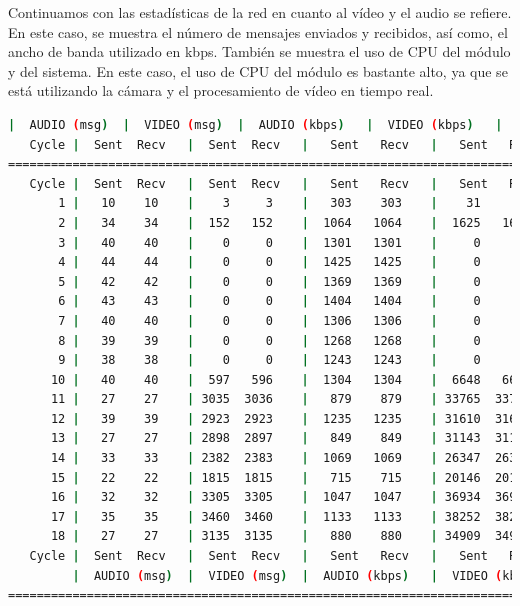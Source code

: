 Continuamos con las estadísticas de la red en cuanto al vídeo y el audio se refiere. En este caso, se muestra el número de mensajes enviados y recibidos, así como, el ancho de banda utilizado en kbps. También se muestra el uso de CPU del módulo y del sistema. En este caso, el uso de CPU del módulo es bastante alto, ya que se está utilizando la cámara y el procesamiento de vídeo en tiempo real. 
\begin{lstlisting}[language=bash,basicstyle=\ttfamily\tiny]
         |  AUDIO (msg)  |  VIDEO (msg)  |  AUDIO (kbps)   |  VIDEO (kbps)   |     CPU (%) 
   Cycle |  Sent  Recv   |  Sent  Recv   |   Sent   Recv   |   Sent   Recv   | Program System
================================================================================================
   Cycle |  Sent  Recv   |  Sent  Recv   |   Sent   Recv   |   Sent   Recv   | Program System
       1 |   10    10    |    3     3    |   303    303    |    31     31    |  33    100       
       2 |   34    34    |  152   152    |  1064   1064    |  1625   1625    |  41     66       
       3 |   40    40    |    0     0    |  1301   1301    |     0      0    |  42     65       
       4 |   44    44    |    0     0    |  1425   1425    |     0      0    |  34     68       
       5 |   42    42    |    0     0    |  1369   1369    |     0      0    |  50     72       
       6 |   43    43    |    0     0    |  1404   1404    |     0      0    |  46     71       
       7 |   40    40    |    0     0    |  1306   1306    |     0      0    |  42     68       
       8 |   39    39    |    0     0    |  1268   1268    |     0      0    |  47     72       
       9 |   38    38    |    0     0    |  1243   1243    |     0      0    |  47     75       
      10 |   40    40    |  597   596    |  1304   1304    |  6648   6637    |  41     73       
      11 |   27    27    | 3035  3036    |   879    879    | 33765  33776    |  48     70       
      12 |   39    39    | 2923  2923    |  1235   1235    | 31610  31610    |  35     75       
      13 |   27    27    | 2898  2897    |   849    849    | 31143  31132    |  54     69       
      14 |   33    33    | 2382  2383    |  1069   1069    | 26347  26358    |  48     74       
      15 |   22    22    | 1815  1815    |   715    715    | 20146  20146    |  32     71       
      16 |   32    32    | 3305  3305    |  1047   1047    | 36934  36934    |  51     74       
      17 |   35    35    | 3460  3460    |  1133   1133    | 38252  38252    |  63     74       
      18 |   27    27    | 3135  3135    |   880    880    | 34909  34909    |  50     70       
   Cycle |  Sent  Recv   |  Sent  Recv   |   Sent   Recv   |   Sent   Recv   | Program System
         |  AUDIO (msg)  |  VIDEO (msg)  |  AUDIO (kbps)   |  VIDEO (kbps)   |     CPU (%) 
===========================================================================================
\end{lstlisting}

